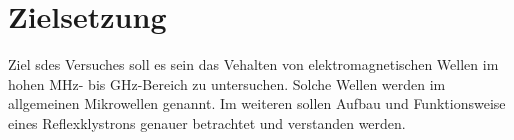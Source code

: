 \section{Zielsetzung}
\label{sec:ziel}
Ziel sdes Versuches soll es sein  das Vehalten von elektromagnetischen Wellen im hohen MHz- 
bis GHz-Bereich zu untersuchen. Solche Wellen werden im allgemeinen Mikrowellen genannt.
Im weiteren sollen Aufbau und Funktionsweise eines Reflexklystrons genauer betrachtet
und verstanden werden.
